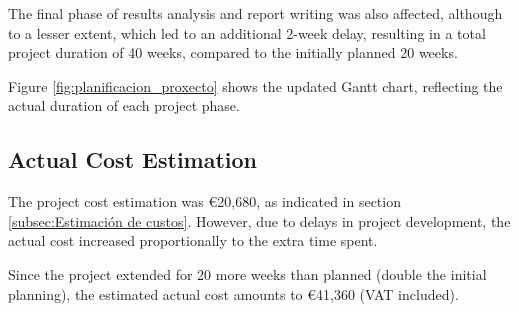 The final phase of results analysis and report writing was also affected, although to a lesser extent, which led to an additional 2-week delay, resulting in a total project duration of 40 weeks, compared to the initially planned 20 weeks.

Figure \ref{fig:planificacion_proxecto} shows the updated Gantt chart, reflecting the actual duration of each project phase.

\subsection{Actual Cost Estimation}
\label{subsec:Estimación de custo real}

The project cost estimation was €20,680, as indicated in section \ref{subsec:Estimación de custos}. However, due to delays in project development, the actual cost increased proportionally to the extra time spent.

Since the project extended for 20 more weeks than planned (double the initial planning), the estimated actual cost amounts to €41,360 (VAT included).